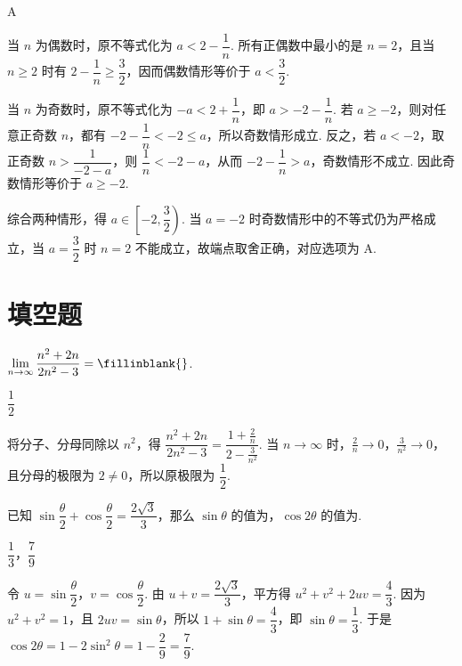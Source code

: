 \begin{answer}
A
\end{answer}

\begin{solution}
当 \(n\) 为偶数时，原不等式化为 \(a<2-\dfrac1n\). 所有正偶数中最小的是 \(n=2\)，且当 \(n\geqslant2\) 时有 \(2-\dfrac1n\geqslant\dfrac32\)，因而偶数情形等价于 \(a<\dfrac32\).

当 \(n\) 为奇数时，原不等式化为 \(-a<2+\dfrac1n\)，即 \(a>-2-\dfrac1n\). 若 \(a\geqslant-2\)，则对任意正奇数 \(n\)，都有 \(-2-\dfrac1n<-2\leqslant a\)，所以奇数情形成立. 反之，若 \(a<-2\)，取正奇数 \(n>\dfrac1{-2-a}\)，则 \(\dfrac1n<-2-a\)，从而 \(-2-\dfrac1n>a\)，奇数情形不成立. 因此奇数情形等价于 \(a\geqslant-2\).

综合两种情形，得 \(a\in\left[-2,\dfrac32\right)\).
当 \(a=-2\) 时奇数情形中的不等式仍为严格成立，当 \(a=\dfrac32\) 时 \(n=2\) 不能成立，故端点取舍正确，对应选项为 A.
\end{solution}

\section{填空题}

\begin{problem}
\(\displaystyle\lim_{n\to\infty}\frac{n^2+2n}{2n^2-3}=\fillinblank{}\).
\end{problem}

\begin{answer}
\(\dfrac12\)
\end{answer}

\begin{solution}
将分子、分母同除以 \(n^2\)，得 \(\dfrac{n^2+2n}{2n^2-3}=\dfrac{1+\frac{2}{n}}{2-\frac{3}{n^2}}\). 当 \(n\to\infty\) 时，\(\frac{2}{n}\to0\)，\(\frac{3}{n^2}\to0\)，且分母的极限为 \(2\neq0\)，所以原极限为 \(\dfrac12\).
\end{solution}

\begin{problem}
已知 \(\sin\dfrac{\theta}{2}+\cos\dfrac{\theta}{2}=\dfrac{2\sqrt3}{3}\)，那么 \(\sin\theta\) 的值为\fillinblank{}，\(\cos 2\theta\) 的值为\fillinblank{}.
\end{problem}

\begin{answer}
\(\dfrac13\)，\(\dfrac79\)
\end{answer}

\begin{solution}
令 \(u=\sin\dfrac\theta2\)，\(v=\cos\dfrac\theta2\). 由 \(u+v=\dfrac{2\sqrt3}{3}\)，平方得 \(u^2+v^2+2uv=\dfrac43\). 因为 \(u^2+v^2=1\)，且 \(2uv=\sin\theta\)，所以 \(1+\sin\theta=\dfrac43\)，即 \(\sin\theta=\dfrac13\). 于是 \(\cos2\theta=1-2\sin^2\theta=1-\dfrac29=\dfrac79\).
\end{solution}

